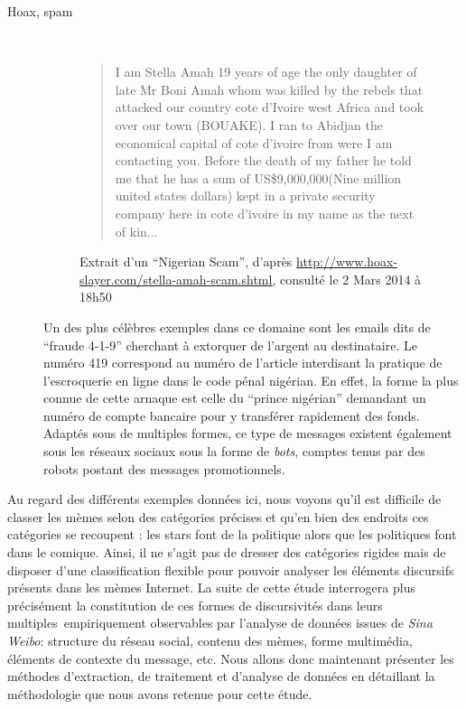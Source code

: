 \begin{description}
\item[Hoax, spam]
\hfill \\
\begin{figure}[ht]
    \begin{quote}
        I am Stella Amah 19 years of age the only daughter of late Mr Boni Amah whom was killed by the rebels that attacked our country cote d'Ivoire west Africa and took over our town (BOUAKE). I ran to Abidjan the economical capital of cote d'ivoire from were I am contacting you. Before the death of my father he told me that he has a sum of US\$9,000,000(Nine million united states dollars) kept in a private security company here in cote d'ivoire in my name as the next of kin... 
    \end{quote}
    \caption[Extrait d'un spam du type \textit{Nigerian Scam}]{
        Extrait d{\textquoteright}un {\textquotedblleft}Nigerian Scam{\textquotedblright}, d{\textquoteright}après \url{http://www.hoax-slayer.com/stella-amah-scam.shtml,} consulté le 2 Mars 2014 à 18h50
    }
    \label{fig:nigerian-scam}
\end{figure}

Un des plus célèbres exemples dans ce domaine sont les emails dits de {\textquotedblleft}fraude 4-1-9{\textquotedblright} cherchant à extorquer de l{\textquoteright}argent au destinataire. Le numéro 419 correspond au numéro de l{\textquoteright}article interdisant la pratique de l{\textquoteright}escroquerie en ligne dans le code pénal nigérian. En effet, la forme la plus connue de cette arnaque est celle du {\textquotedblleft}prince nigérian{\textquotedblright} demandant un numéro de compte bancaire pour y transférer rapidement des fonds. Adaptés sous de multiples formes, ce type de messages existent également sous les réseaux sociaux sous la forme de \textit{bots}, comptes tenus par des robots postant des messages promotionnels.  


\end{description}

Au regard des différents exemples données ici, nous voyons qu{\textquoteright}il est difficile de classer les mèmes selon des catégories précises et qu{\textquoteright}en bien des endroits ces catégories se recoupent : les stars font de la politique alors que les politiques font dans le comique. Ainsi, il ne s{\textquoteright}agit pas de dresser des catégories rigides mais de disposer d{\textquoteright}une classification flexible pour pouvoir analyser les éléments discursifs présents dans les mèmes Internet. La suite de cette étude interrogera plus précisément la constitution de ces formes de discursivités dans leurs multiples~empiriquement observables par l{\textquoteright}analyse de données issues de \textit{Sina Weibo}: structure du réseau social, contenu des mèmes, forme multimédia, éléments de contexte du message, etc. Nous allons donc maintenant présenter les méthodes d{\textquoteright}extraction, de traitement et d{\textquoteright}analyse de données en détaillant la méthodologie que nous avons retenue pour cette étude.